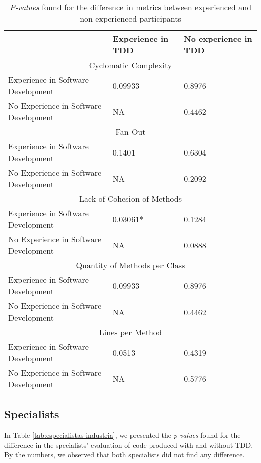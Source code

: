 \documentclass[times]{elsarticle}
\begin{document}
\begin{table}
	\centering
	\begin{tabular}{ | p{5cm} | p{3.5cm} | p{3.5cm} | }
		\hline
		  & \textbf{Experience in TDD} & \textbf{No experience in TDD} \\
		\hline
			\multicolumn{3}{|c|}{Cyclomatic Complexity} \\
		\hline
			Experience in Software Development 		& 0.09933	&	0.8976\\
			\hline
			No Experience in Software Development 	& NA		&	0.4462\\
		\hline
			\multicolumn{3}{|c|}{Fan-Out}\\
		\hline
			Experience in Software Development 		& 0.1401	&	0.6304\\
			\hline
			No Experience in Software Development 	& NA		&	0.2092\\
		\hline
			\multicolumn{3}{|c|}{Lack of Cohesion of Methods}\\
		\hline
			Experience in Software Development 		& \cellcolor[gray]{0.8}0.03061*	&	0.1284\\
			\hline
			No Experience in Software Development 	& NA		&	0.0888\\
		\hline
			\multicolumn{3}{|c|}{Quantity of Methods per Class} \\
		\hline
			Experience in Software Development 		& 0.09933	&	0.8976\\
			\hline
			No Experience in Software Development 	& NA		&	0.4462\\
		\hline
			\multicolumn{3}{|c|}{Lines per Method}\\
		\hline
			Experience in Software Development 		& 0.0513	&	0.4319\\
			\hline
			No Experience in Software Development 	& NA		&	0.5776\\
		\hline
	\end{tabular}
	\caption{\textit{P-values} found for the difference in metrics between experienced and non experienced participants}
	\label{valores-separados}
\end{table}

\subsection{Specialists}

In Table
\ref{tab:especialistas-industria}, we presented the \textit{p-values} found for the
difference in the specialists' evaluation of code produced with and without TDD.
By the numbers, we observed that both specialists did not find any difference.
\end{document}
